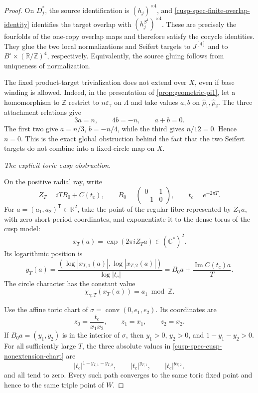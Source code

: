 \begin{proof}
On \(D_j^*\), the source identification is \((h_j)^{\times4}\), and
\cref{cusp-spec-finite-overlap-identity} identifies the target overlap
with \((h_j^{S^1})^{\times4}\).  These are precisely the fourfolds of
the one-copy overlap maps and therefore satisfy the cocycle identities.
They glue the two local normalizations and Seifert targets to
\(J^{[4]}\) and to
\(B^\circ\times(\mathbb R/\mathbb Z)^4\), respectively.  Equivalently,
the source gluing follows from uniqueness of normalization.

The fixed product-target trivialization does not extend over \(X\), even if
base winding is allowed.  Indeed, in the presentation of
\cref{prop:geometric-pi1}, let a homomorphism to \(\mathbb Z\) restrict to
\(n\varepsilon_\gamma\) on \(\Lambda\) and take values \(a,b\) on
\(\widehat\rho_1,\widehat\rho_2\).  The three attachment relations give
\[
 3a=n,\qquad4b=-n,\qquad a+b=0.
\]
The first two give \(a=n/3\), \(b=-n/4\), while the third gives
\(n/12=0\).  Hence \(n=0\).  This is the exact global obstruction behind
the fact that the two Seifert targets do not combine into a fixed-circle
map on \(X\).

\medskip\noindent\emph{The explicit toric cusp obstruction.}\par
On the positive radial ray, write
\[
 Z_T=iTB_0+C(t_c),\qquad
 B_0=\begin{pmatrix}0&1\\-1&0\end{pmatrix},\qquad
 t_c=e^{-2\pi T}.
\]
For \(a=(a_1,a_2)^{\mathsf T}\in\mathbb R^2\), take the point of the
regular fibre represented by \(Z_Ta\), with zero short-period coordinates,
and exponentiate it to the dense torus of the cusp model:
\[
 x_T(a)=\exp(2\pi iZ_Ta)\in(\mathbb C^*)^2.
\]
Its logarithmic position is
\begin{equation}
 y_T(a)=
 \frac{(\log|x_{T,1}(a)|,\log|x_{T,2}(a)|)}{\log|t_c|}
 =B_0a+\frac{\operatorname{Im}C(t_c)a}{T}.
 \label{cusp-spec-cusp-nonextension-position}
\end{equation}
The circle character has the constant value
\begin{equation}
 \chi_{\gamma,T}(x_T(a))=a_1\bmod\mathbb Z.
 \label{cusp-spec-cusp-nonextension-character}
\end{equation}

Use the affine toric chart of
\(\sigma=\operatorname{conv}(0,e_1,e_2)\).  Its coordinates are
\begin{equation}
 z_0=\frac{t_c}{x_1x_2},\qquad z_1=x_1,\qquad z_2=x_2.
 \label{cusp-spec-cusp-nonextension-chart}
\end{equation}
If \(B_0a=(y_1,y_2)\) is in the interior of \(\sigma\), then
\(y_1>0\), \(y_2>0\), and \(1-y_1-y_2>0\).  For all sufficiently large
\(T\), the three absolute values in
\cref{cusp-spec-cusp-nonextension-chart} are
\[
 |t_c|^{1-y_{T,1}-y_{T,2}},\qquad
 |t_c|^{y_{T,1}},\qquad |t_c|^{y_{T,2}},
\]
and all tend to zero.  Every such path converges to the same toric fixed
point and hence to the same triple point of \(W\).


\end{proof}
